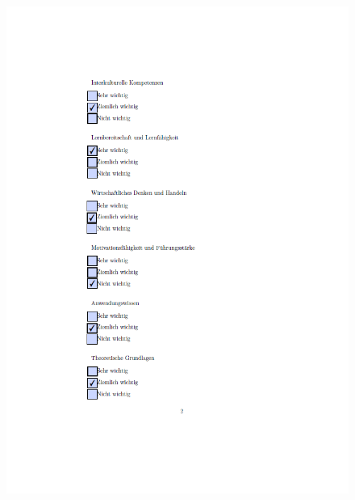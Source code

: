 \begin{figure}[ht]
 	\centering
 	\includegraphics[width=1.3\textwidth]{images/Imper2.png}
 	\label{fig:fragimp2}
\end{figure}

